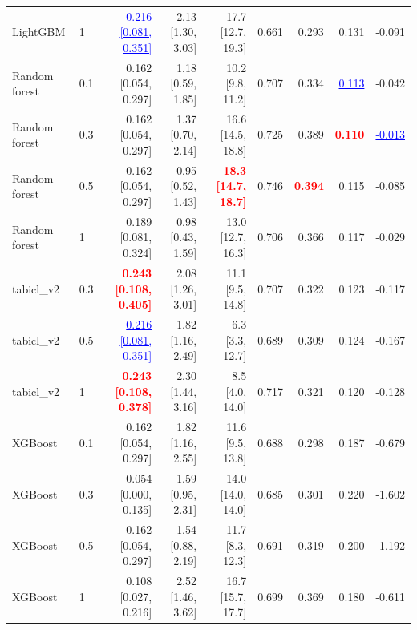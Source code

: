 \begin{table}[!htbp]
{\begin{tabular}{llrrrrrrr}
LightGBM & 1 & \textcolor{blue}{\underline{0.216 [0.081, 0.351]}} & 2.13 [1.30, 3.03] & 17.7 [12.7, 19.3] & 0.661 & 0.293 & 0.131 & -0.091 \\
Random forest & 0.1 & 0.162 [0.054, 0.297] & 1.18 [0.59, 1.85] & 10.2 [9.8, 11.2] & 0.707 & 0.334 & \textcolor{blue}{\underline{0.113}} & -0.042 \\
Random forest & 0.3 & 0.162 [0.054, 0.297] & 1.37 [0.70, 2.14] & 16.6 [14.5, 18.8] & 0.725 & 0.389 & \textcolor{red}{\textbf{0.110}} & \textcolor{blue}{\underline{-0.013}} \\
Random forest & 0.5 & 0.162 [0.054, 0.297] & 0.95 [0.52, 1.43] & \textcolor{red}{\textbf{18.3 [14.7, 18.7]}} & 0.746 & \textcolor{red}{\textbf{0.394}} & 0.115 & -0.085 \\
Random forest & 1 & 0.189 [0.081, 0.324] & 0.98 [0.43, 1.59] & 13.0 [12.7, 16.3] & 0.706 & 0.366 & 0.117 & -0.029 \\
tabicl\_v2 & 0.3 & \textcolor{red}{\textbf{0.243 [0.108, 0.405]}} & 2.08 [1.26, 3.01] & 11.1 [9.5, 14.8] & 0.707 & 0.322 & 0.123 & -0.117 \\
tabicl\_v2 & 0.5 & \textcolor{blue}{\underline{0.216 [0.081, 0.351]}} & 1.82 [1.16, 2.49] & 6.3 [3.3, 12.7] & 0.689 & 0.309 & 0.124 & -0.167 \\
tabicl\_v2 & 1 & \textcolor{red}{\textbf{0.243 [0.108, 0.378]}} & 2.30 [1.44, 3.16] & 8.5 [4.0, 14.0] & 0.717 & 0.321 & 0.120 & -0.128 \\
XGBoost & 0.1 & 0.162 [0.054, 0.297] & 1.82 [1.16, 2.55] & 11.6 [9.5, 13.8] & 0.688 & 0.298 & 0.187 & -0.679 \\
XGBoost & 0.3 & 0.054 [0.000, 0.135] & 1.59 [0.95, 2.31] & 14.0 [14.0, 14.0] & 0.685 & 0.301 & 0.220 & -1.602 \\
XGBoost & 0.5 & 0.162 [0.054, 0.297] & 1.54 [0.88, 2.19] & 11.7 [8.3, 12.3] & 0.691 & 0.319 & 0.200 & -1.192 \\
XGBoost & 1 & 0.108 [0.027, 0.216] & 2.52 [1.46, 3.62] & 16.7 [15.7, 17.7] & 0.699 & 0.369 & 0.180 & -0.611 \\
\bottomrule
\end{tabular}
}
\end{table}
